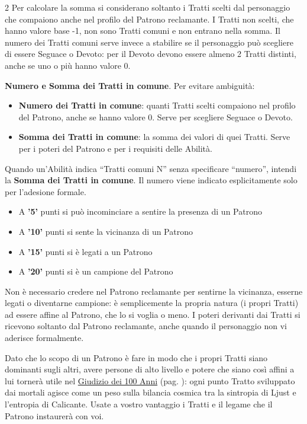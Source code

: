 \begin{multicols}{2}
Per calcolare la somma si considerano soltanto i Tratti scelti dal personaggio che compaiono anche nel profilo del Patrono reclamante. I Tratti non scelti, che hanno valore base -1, non sono Tratti comuni e non entrano nella somma. Il numero dei Tratti comuni serve invece a stabilire se il personaggio può scegliere di essere Seguace o Devoto: per il Devoto devono essere almeno 2 Tratti distinti, anche se uno o più hanno valore 0.

\medskip

\textbf{Numero e Somma dei Tratti in comune}. Per evitare ambiguità:
\begin{itemize}[leftmargin=*] \setlength{\itemsep}{0pt}
\item \textbf{Numero dei Tratti in comune}: quanti Tratti scelti compaiono nel profilo del Patrono, anche se hanno valore 0. Serve per scegliere Seguace o Devoto.
\item \textbf{Somma dei Tratti in comune}: la somma dei valori di quei Tratti. Serve per i poteri del Patrono e per i requisiti delle Abilità.
\end{itemize}
Quando un'Abilità indica ``Tratti comuni N'' senza specificare ``numero'', intendi la \textbf{Somma dei Tratti in comune}. Il numero viene indicato esplicitamente solo per l'adesione formale.

\noindent\begin{itemize}[leftmargin=*] \setlength{\itemsep}{0pt}
\item A \textbf{'5'} punti si può incominciare a sentire la presenza di un Patrono

\item A \textbf{'10'} punti si sente la vicinanza di un Patrono

\item A \textbf{'15'} punti si è legati a un Patrono

\item A \textbf{'20'} punti si è un campione del Patrono
\end{itemize}

Non è necessario credere nel Patrono reclamante per sentirne la vicinanza, esserne legati o diventarne campione: è semplicemente la propria natura (i propri Tratti) ad essere affine al Patrono, che lo si voglia o meno. I poteri derivanti dai Tratti si ricevono soltanto dal Patrono reclamante, anche quando il personaggio non vi aderisce formalmente.

Dato che lo scopo di un Patrono è fare in modo che i propri Tratti siano dominanti sugli altri, avere persone di alto livello e potere che siano così affini a lui tornerà utile nel \hyperlink{giudiziocentoanni}{Giudizio dei 100 Anni} (pag. \pageref{giudiziocentoanni}): ogni punto Tratto sviluppato dai mortali agisce come un peso sulla bilancia cosmica tra la sintropia di Ljust e l'entropia di Calicante. Usate a vostro vantaggio i Tratti e il legame che il Patrono instaurerà con voi.


\end{multicols}
